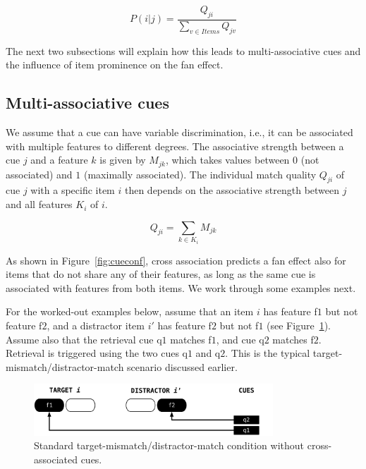 \documentclass{cambridge7A}\usepackage[]{graphicx}\usepackage[]{color}
\begin{document}
\begin{equation} \label{eq:newfan}
	P(i|j) = \frac{Q_{ji}}{\sum\limits_{v \in Items} Q_{jv}}
\end{equation}

The next two subsections will explain how this leads to multi-associative cues and the influence of item prominence on the fan effect.

\subsection{Multi-associative cues}
We assume that a cue can have variable discrimination, i.e., it can be associated with multiple features to different degrees. The associative strength between a cue $j$ and a feature $k$ is given by $M_{jk}$, which takes values between $0$ (not associated) and $1$ (maximally associated). 
The individual match quality $Q_{ji}$ of cue $j$ with a specific item $i$ then depends on the associative strength between $j$ and all features $K_i$ of $i$. 

\begin{equation}
    Q_{ji} = \sum_{k \in K_i} M_{jk} \label{eq:Qji}
\end{equation}

As shown in Figure~\ref{fig:cueconf},  cross association predicts a fan effect also for items that do not share any of their features, as long as the same cue is associated with features from both items. We work through some examples next.

For the worked-out examples below, assume that an item $i$ has feature f$1$ but not feature f$2$, and a distractor item $i'$ has feature f$2$ but not f$1$ (see Figure~\ref{fig:implFig1}). Assume also that the retrieval cue q$1$ matches f$1$, and cue q$2$ matches f$2$. Retrieval is triggered using the two cues q$1$ and q$2$. This is the typical target-mismatch/distractor-match scenario discussed earlier.


\begin{figure}[htbp]
	\centering
	\includegraphics[width=0.80\textwidth]{figures/implFig1}
	\caption{Standard target-mismatch/distractor-match condition without cross-associated cues.}
	\label{fig:implFig1}
\end{figure}
\end{document}
